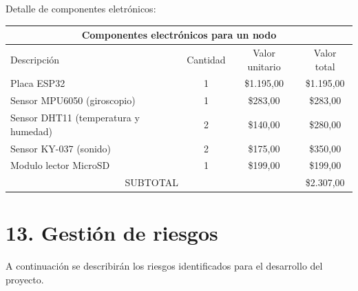 \documentclass[
11pt, %
codirector, %
]{charter}
\begin{document}
Detalle de componentes eletrónicos:
\begin{table}[htpb]
\centering
\begin{tabularx}{\linewidth}{@{}|X|c|r|r|@{}}
\hline
\multicolumn{4}{|c|}{\cellcolor[HTML]{C0C0C0}Componentes electrónicos para un nodo} \\ \hline
\rowcolor[HTML]{C0C0C0} 
Descripción &
  \multicolumn{1}{c|}{\cellcolor[HTML]{C0C0C0}Cantidad} &
  \multicolumn{1}{c|}{\cellcolor[HTML]{C0C0C0}Valor unitario} &
  \multicolumn{1}{c|}{\cellcolor[HTML]{C0C0C0}Valor total} \\ \hline
	Placa ESP32&
  \multicolumn{1}{c|}{1} &
  \multicolumn{1}{c|}{\$1.195,00} &
  \multicolumn{1}{c|}{\$1.195,00} \\ \hline
  	Sensor MPU6050 (giroscopio) &
  \multicolumn{1}{c|}{1} &
  \multicolumn{1}{c|}{\$283,00} &
  \multicolumn{1}{c|}{\$283,00} \\ \hline
	Sensor DHT11 (temperatura y humedad) &
  \multicolumn{1}{c|}{2} &
  \multicolumn{1}{c|}{\$140,00} &
  \multicolumn{1}{c|}{\$280,00} \\ \hline
	Sensor KY-037 (sonido)  &
  \multicolumn{1}{c|}{2} &
  \multicolumn{1}{c|}{\$175,00} &
  \multicolumn{1}{c|}{\$350,00} \\ \hline
	Modulo lector MicroSD  &
  \multicolumn{1}{c|}{1} &
  \multicolumn{1}{c|}{\$199,00} &
  \multicolumn{1}{c|}{\$199,00} \\ \hline

\multicolumn{3}{|c|}{SUBTOTAL} &
\multicolumn{1}{c|}{\$2.307,00} \\ \hline
\end{tabularx}%
\end{table}


\section{13. Gestión de riesgos}
\label{sec:riesgos}

A continuación se describirán los riesgos identificados para el desarrollo del proyecto.
\end{document}
